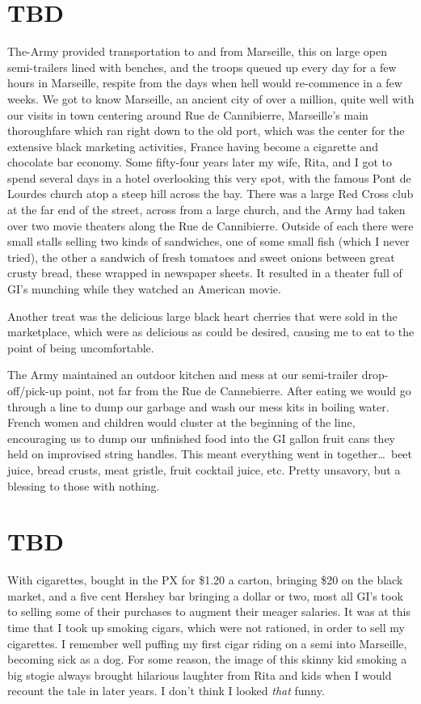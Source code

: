 \documentclass[../m3y]{subfiles}
\begin{document}
\section{TBD}
The-Army provided transportation to and from Marseille, this on large open semi-trailers lined with benches, and the troops queued up every day for a few hours in Marseille, respite from the days when hell would re-commence in a few weeks. We got to know Marseille, an ancient city of over a million, quite well with our visits in town centering around Rue de Cannibierre, Marseille's main thoroughfare which ran right down to the old port, which was the center for the extensive black marketing activities, France having become a cigarette and chocolate bar economy. Some fifty-four years later my wife, Rita, and I got to spend several days in a hotel overlooking this very spot, with the famous Pont de Lourdes church atop a steep hill across the bay. There was a large Red Cross club at the far end of the street, across from a large church, and the Army had taken over two movie theaters along the Rue de Cannibierre. Outside of each there were small stalls selling two kinds of sandwiches, one of some small fish (which I never tried), the other a sandwich of fresh tomatoes and sweet onions between great crusty bread, these wrapped in newspaper sheets. It resulted in a theater full of GI's munching while they watched an American movie.

Another treat was the delicious large black heart cherries that were sold in the marketplace, which were as delicious as could be desired, causing me to eat to the point of being uncomfortable.

The Army maintained an outdoor kitchen and mess at our semi-trailer drop-off/pick-up point, not far from the Rue de Cannebierre. After eating we would go through a line to dump our garbage and wash our mess kits in boiling water. French women and children would cluster at the beginning of the line, encouraging us to dump our unfinished food into the GI gallon fruit cans they held on improvised string handles. This meant everything went in together\ldots\ beet juice, bread crusts, meat gristle, fruit cocktail juice, etc\@. Pretty unsavory, but a blessing to those with nothing.

\section{TBD}
With cigarettes, bought in the PX for \$1.20 a carton, bringing \$20 on the black market, and a five cent Hershey bar bringing a dollar or two, most all GI's took to selling some of their purchases to augment their meager salaries. It was at this time that I took up smoking cigars, which were not rationed, in order to sell my cigarettes. I remember well puffing my first cigar riding on a semi into Marseille, becoming sick as a dog. For some reason, the image of this skinny kid smoking a big stogie always brought hilarious laughter from Rita and kids when I would recount the tale in later years. I don't think I looked \emph{that} funny.
\end{document}
